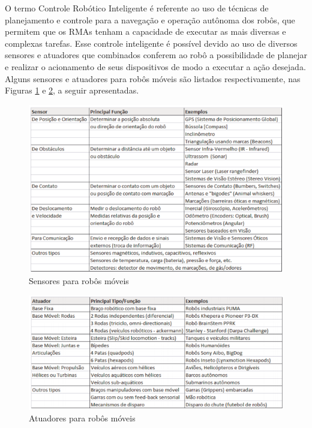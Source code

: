 O termo Controle Robótico Inteligente é referente ao uso de técnicas de planejamento e controle para a navegação e operação autônoma dos robôs, que permitem que os RMAs tenham a capacidade de executar as mais diversas e complexas tarefas. Esse controle inteligente é possível devido ao uso de diversos sensores e atuadores que combinados conferem ao robô a possibilidade de planejar e realizar o acionamento de seus dispositivos de modo a executar a ação desejada. Alguns sensores e atuadores para robôs móveis são listados respectivamente, nas Figuras \ref{sensores} e \ref{atuadores}, a seguir apresentadas.

\FloatBarrier
\begin{figure}[!h]
\centering
\includegraphics[keepaspectratio=true,scale=0.7]{figuras/sensoresRobosMoveis.png}
\caption{Sensores para robôs móveis \cite{wolf2009robotica}}
\label{sensores}
\end{figure}

\FloatBarrier
\begin{figure}[!h]
\centering
\includegraphics[keepaspectratio=true,scale=0.7]{figuras/atuadoresRobosMoveis.png}
\caption{Atuadores para robôs móveis \cite{wolf2009robotica}}
\label{atuadores}
\end{figure}

